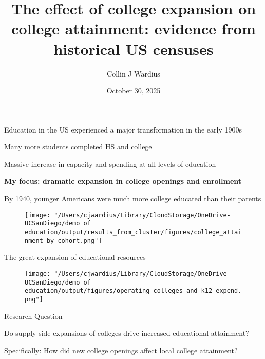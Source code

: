 \documentclass[notes,11pt, aspectratio=169]{beamer}
\title[]{The effect of college expansion on college attainment: evidence from historical US censuses}
\author{Collin J Wardius} %
\institute{
  Department of Economics, UC San Diego
  \newline
  Approved by
}
\date[]{October 30, 2025}
\newenvironment{wideitemize}{\itemize\addtolength{\itemsep}{10pt}}{\enditemize}
\begin{document}
\begin{frame}
  \titlepage
\end{frame}

\begin{frame}{Education in the US experienced a major transformation in the early 1900s}
 \begin{wideitemize}
\item Many more students completed HS and college
\item Massive increase in capacity and spending at all levels of education
\item \textbf{My focus: dramatic expansion in college openings and enrollment}
\end{wideitemize}
\end{frame}

\begin{frame}{By 1940, younger Americans were much more college educated than their parents}
  \begin{figure}
        \centering
        \texttt{[image: "/Users/cjwardius/Library/CloudStorage/OneDrive-UCSanDiego/demo of education/output/results\_from\_cluster/figures/college\_attainment\_by\_cohort.png"]}
    \end{figure}
\end{frame}



\begin{frame}{The great expansion of educational resources}
  \begin{figure}
        \centering
        \texttt{[image: "/Users/cjwardius/Library/CloudStorage/OneDrive-UCSanDiego/demo of education/output/figures/operating\_colleges\_and\_k12\_expend.png"]}
    \end{figure}
\end{frame}

\begin{frame}{Research Question}
\begin{wideitemize}
\item Do supply-side expansions of colleges drive increased educational attainment?
\item Specifically: How did new college openings affect local college attainment?
\end{wideitemize}
\end{frame}
\end{document}
